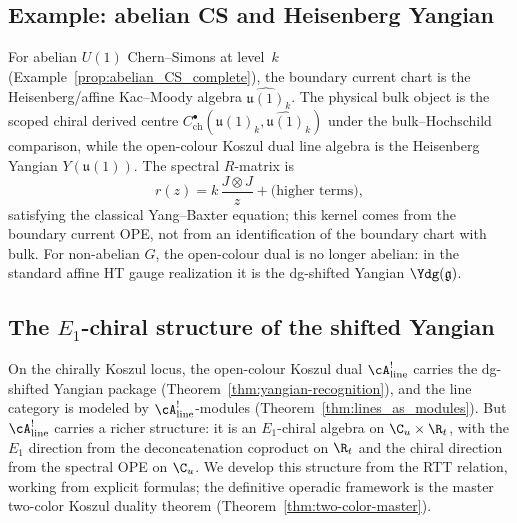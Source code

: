 \subsection{Example: abelian CS and Heisenberg Yangian}

\begin{example}
\label{ex:Heisenberg_Yangian}
For abelian $U(1)$ Chern--Simons at level~$k$
\textup{(}Example~\textup{\ref{prop:abelian_CS_complete}}\textup{)},
the boundary current chart is the Heisenberg/affine Kac--Moody
algebra $\widehat{\mathfrak{u}(1)}_k$.  The physical bulk object is
the scoped chiral derived centre
$C^\bullet_{\mathrm{ch}}(\widehat{\mathfrak{u}(1)}_k,
\widehat{\mathfrak{u}(1)}_k)$ under the bulk--Hochschild comparison,
while the open-colour Koszul dual line algebra is the Heisenberg
Yangian $Y(\mathfrak{u}(1))$. The spectral $R$-matrix is
\begin{equation}
r(z) = k \, \frac{J \otimes J}{z} + \text{(higher terms)},
\end{equation}
satisfying the classical Yang--Baxter equation; this kernel comes from
the boundary current OPE, not from an identification of the boundary
chart with bulk. For non-abelian $G$, the open-colour dual is no
longer abelian: in the standard affine HT gauge realization it is the
dg-shifted Yangian $\Ydg(\mathfrak{g})$.
\end{example}


\subsection{The $E_1$-chiral structure of the shifted Yangian}
\label{subsec:E1-chiral-yangian}

On the chirally Koszul locus, the open-colour Koszul dual
$\cA^!_{\mathrm{line}}$ carries the
dg-shifted Yangian package
\textup{(}Theorem~\textup{\ref{thm:yangian-recognition}}\textup{)},
and the line category is modeled by $\cA^!_{\mathrm{line}}$-modules
(Theorem~\ref{thm:lines_as_modules}).
But $\cA^!_{\mathrm{line}}$ carries a richer structure: it is an $E_1$-chiral
algebra on $\C_u \times \R_t$, with the $E_1$ direction from
the deconcatenation coproduct on $\R_t$ and the chiral direction
from the spectral OPE on $\C_u$. We develop this structure
from the RTT relation, working from explicit formulas; the
definitive operadic framework is the master two-color Koszul
duality theorem (Theorem~\ref{thm:two-color-master}).

